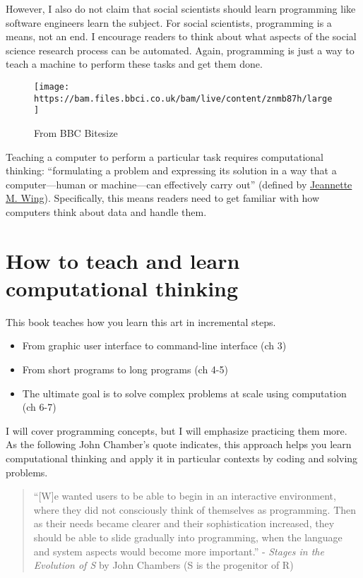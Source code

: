 \documentclass[
]{book}
\begin{document}
However, I also do not claim that social scientists should learn programming like software engineers learn the subject. For social scientists, programming is a means, not an end. I encourage readers to think about what aspects of the social science research process can be automated. Again, programming is just a way to teach a machine to perform these tasks and get them done.

\begin{figure}
\centering
\texttt{[image: https://bam.files.bbci.co.uk/bam/live/content/znmb87h/large]}
\caption{From BBC Bitesize}
\end{figure}

Teaching a computer to perform a particular task requires computational thinking: ``formulating a problem and expressing its solution in a way that a computer---human or machine---can effectively carry out'' (defined by \href{http://www.cs.cmu.edu/afs/cs/usr/wing/www/publications/Wing06.pdf}{Jeannette M. Wing}). Specifically, this means readers need to get familiar with how computers think about data and handle them.

\hypertarget{how-to-teach-and-learn-computational-thinking}{%
\section{How to teach and learn computational thinking}\label{how-to-teach-and-learn-computational-thinking}}

This book teaches how you learn this art in incremental steps.

\begin{itemize}
\item
  From graphic user interface to command-line interface (ch 3)
\item
  From short programs to long programs (ch 4-5)
\item
  The ultimate goal is to solve complex problems at scale using computation (ch 6-7)
\end{itemize}

I will cover programming concepts, but I will emphasize practicing them more. As the following John Chamber's quote indicates, this approach helps you learn computational thinking and apply it in particular contexts by coding and solving problems.

\begin{quote}
``{[}W{]}e wanted users to be able to begin in an interactive environment, where they did not consciously think of themselves as programming. Then as their needs became clearer and their sophistication increased, they should be able to slide gradually into programming, when the language and system aspects would become more important.'' - \emph{Stages in the Evolution of S} by John Chambers (S is the progenitor of R)
\end{quote}
\end{document}
